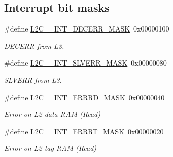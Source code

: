 \subsection*{Interrupt bit masks}
\begin{DoxyCompactItemize}
\item 
\mbox{\label{group__L2C-310__cache_gaaa103f414fb99698fc12d228668c1210}} 
\#define \mbox{\hyperlink{group__L2C-310__cache_gaaa103f414fb99698fc12d228668c1210}{L2\+C\+\_\+\_\+\+I\+N\+T\+\_\+\+D\+E\+C\+E\+R\+R\+\_\+\+M\+A\+SK}}~0x00000100
\begin{DoxyCompactList}\small\item\em D\+E\+C\+E\+RR from L3. \end{DoxyCompactList}\item 
\mbox{\label{group__L2C-310__cache_gad4ff5a1a4d507167e01825d90425bfe4}} 
\#define \mbox{\hyperlink{group__L2C-310__cache_gad4ff5a1a4d507167e01825d90425bfe4}{L2\+C\+\_\+\_\+\+I\+N\+T\+\_\+\+S\+L\+V\+E\+R\+R\+\_\+\+M\+A\+SK}}~0x00000080
\begin{DoxyCompactList}\small\item\em S\+L\+V\+E\+RR from L3. \end{DoxyCompactList}\item 
\mbox{\label{group__L2C-310__cache_ga6bad6dc80617105a5bed54267054ee06}} 
\#define \mbox{\hyperlink{group__L2C-310__cache_ga6bad6dc80617105a5bed54267054ee06}{L2\+C\+\_\+\_\+\+I\+N\+T\+\_\+\+E\+R\+R\+R\+D\+\_\+\+M\+A\+SK}}~0x00000040
\begin{DoxyCompactList}\small\item\em Error on L2 data R\+AM (Read) \end{DoxyCompactList}\item 
\mbox{\label{group__L2C-310__cache_gaa292378b268566555f94e0cbf0a0298d}} 
\#define \mbox{\hyperlink{group__L2C-310__cache_gaa292378b268566555f94e0cbf0a0298d}{L2\+C\+\_\+\_\+\+I\+N\+T\+\_\+\+E\+R\+R\+R\+T\+\_\+\+M\+A\+SK}}~0x00000020
\begin{DoxyCompactList}\small\item\em Error on L2 tag R\+AM (Read) \end{DoxyCompactList}\item 
\mbox{\label{group__L2C-310__cache_ga2ad8ba7d482f3319c1cb8021612d88d4}} 

\end{DoxyCompactItemize}
